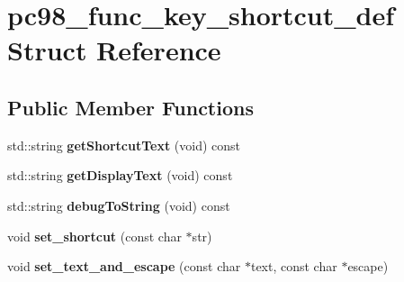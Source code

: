 \hypertarget{structpc98__func__key__shortcut__def}{\section{pc98\-\_\-func\-\_\-key\-\_\-shortcut\-\_\-def Struct Reference}
\label{structpc98__func__key__shortcut__def}
}
\subsection*{Public Member Functions}
\begin{DoxyCompactItemize}
\item 
\hypertarget{structpc98__func__key__shortcut__def_ae5a4e01ba1c90197b29856d631f4ab84}{std\-::string {\bfseries get\-Shortcut\-Text} (void) const }\label{structpc98__func__key__shortcut__def_ae5a4e01ba1c90197b29856d631f4ab84}

\item 
\hypertarget{structpc98__func__key__shortcut__def_ad00ad91972ec1f075e8d53506d542c30}{std\-::string {\bfseries get\-Display\-Text} (void) const }\label{structpc98__func__key__shortcut__def_ad00ad91972ec1f075e8d53506d542c30}

\item 
\hypertarget{structpc98__func__key__shortcut__def_a2f36e8be7bfa1d5522a635d69f3cf246}{std\-::string {\bfseries debug\-To\-String} (void) const }\label{structpc98__func__key__shortcut__def_a2f36e8be7bfa1d5522a635d69f3cf246}

\item 
\hypertarget{structpc98__func__key__shortcut__def_adf68542890dc90d0dc8578d3ecfd1d63}{void {\bfseries set\-\_\-shortcut} (const char $\ast$str)}\label{structpc98__func__key__shortcut__def_adf68542890dc90d0dc8578d3ecfd1d63}

\item 
\hypertarget{structpc98__func__key__shortcut__def_aa00a8dea7639a97f0cc8375f2c0da546}{void {\bfseries set\-\_\-text\-\_\-and\-\_\-escape} (const char $\ast$text, const char $\ast$escape)}\label{structpc98__func__key__shortcut__def_aa00a8dea7639a97f0cc8375f2c0da546}

\end{DoxyCompactItemize}
